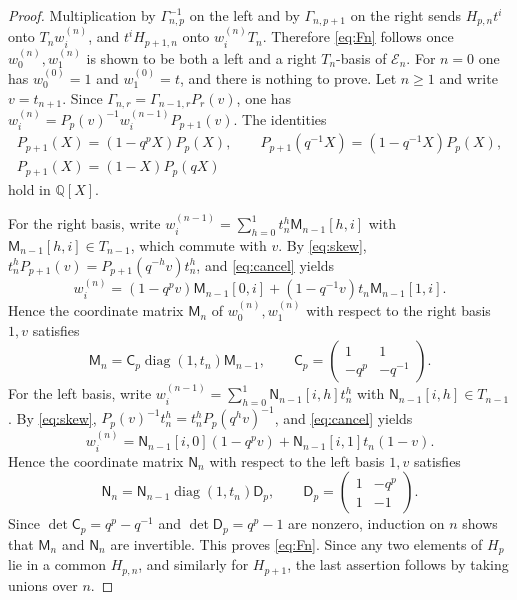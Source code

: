 \documentclass[11pt,a4paper]{amsart}
\numberwithin{equation}{section}
\newcommand{\diag}{\operatorname{diag}}
\newcommand{\Q}{\mathbb{Q}}
\newcommand{\Msf}{\mathsf{M}}
\newcommand{\Nsf}{\mathsf{N}}
\newcommand{\Csf}{\mathsf{C}}
\newcommand{\Dsf}{\mathsf{D}}
\begin{document}
\begin{proof}
Multiplication by $\Gamma_{n,p}^{-1}$ on the left and by $\Gamma_{n,p+1}$ on the right sends $H_{p,n}t^i$ onto $T_nw_i^{(n)}$, and $t^iH_{p+1,n}$ onto $w_i^{(n)}T_n$. Therefore \eqref{eq:Fn} follows once $w_0^{(n)},w_1^{(n)}$ is shown to be both a left and a right $T_n$-basis of $\mathcal E_n$. For $n=0$ one has $w_0^{(0)}=1$ and $w_1^{(0)}=t$, and there is nothing to prove. Let $n\ge1$ and write $v=t_{n+1}$. Since $\Gamma_{n,r}=\Gamma_{n-1,r}P_r(v)$, one has $w_i^{(n)}=P_p(v)^{-1}w_i^{(n-1)}P_{p+1}(v)$. The identities
\begin{equation}\label{eq:cancel}
\begin{gathered}
P_{p+1}(X)=(1-q^pX)P_p(X),\qquad P_{p+1}(q^{-1}X)=(1-q^{-1}X)P_p(X),\\
P_{p+1}(X)=(1-X)P_p(qX)
\end{gathered}
\end{equation}
hold in $\Q[X]$.

For the right basis, write $w_i^{(n-1)}=\sum_{h=0}^{1}t_n^h\Msf_{n-1}[h,i]$ with $\Msf_{n-1}[h,i]\in T_{n-1}$, which commute with $v$. By \eqref{eq:skew}, $t_n^hP_{p+1}(v)=P_{p+1}(q^{-h}v)t_n^h$, and \eqref{eq:cancel} yields
\[
w_i^{(n)}=(1-q^pv)\Msf_{n-1}[0,i]+(1-q^{-1}v)t_n\Msf_{n-1}[1,i].
\]
Hence the coordinate matrix $\Msf_n$ of $w_0^{(n)},w_1^{(n)}$ with respect to the right basis $1,v$ satisfies
\begin{equation}\label{eq:Mrec}
\Msf_n=\Csf_p\diag(1,t_n)\Msf_{n-1},\qquad \Csf_p=\begin{pmatrix}1&1\\-q^p&-q^{-1}\end{pmatrix}.
\end{equation}
For the left basis, write $w_i^{(n-1)}=\sum_{h=0}^{1}\Nsf_{n-1}[i,h]t_n^h$ with $\Nsf_{n-1}[i,h]\in T_{n-1}$. By \eqref{eq:skew}, $P_p(v)^{-1}t_n^h=t_n^hP_p(q^hv)^{-1}$, and \eqref{eq:cancel} yields
\[
w_i^{(n)}=\Nsf_{n-1}[i,0](1-q^pv)+\Nsf_{n-1}[i,1]t_n(1-v).
\]
Hence the coordinate matrix $\Nsf_n$ with respect to the left basis $1,v$ satisfies
\begin{equation}\label{eq:Nrec}
\Nsf_n=\Nsf_{n-1}\diag(1,t_n)\Dsf_p,\qquad \Dsf_p=\begin{pmatrix}1&-q^p\\1&-1\end{pmatrix}.
\end{equation}
Since $\det\Csf_p=q^p-q^{-1}$ and $\det\Dsf_p=q^p-1$ are nonzero, induction on $n$ shows that $\Msf_n$ and $\Nsf_n$ are invertible. This proves \eqref{eq:Fn}. Since any two elements of $H_p$ lie in a common $H_{p,n}$, and similarly for $H_{p+1}$, the last assertion follows by taking unions over $n$.
\end{proof}
\end{document}
